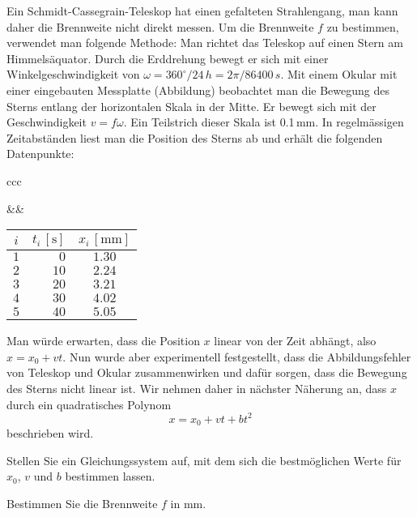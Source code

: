 Ein Schmidt-Cassegrain-Teleskop hat einen gefalteten Strahlengang,
man kann daher die Brennweite nicht direkt messen.
Um die Brennweite $f$ zu bestimmen, verwendet man folgende Methode:
Man richtet das Teleskop auf einen Stern am Himmelsäquator.
Durch die Erddrehung bewegt
er sich mit einer Winkelgeschwindigkeit von
$\omega=360^\circ/24\,h=2\pi/86400\,s$.
Mit einem Okular mit einer eingebauten Messplatte (Abbildung)
beobachtet man die Bewegung des Sterns entlang der horizontalen Skala
in der Mitte.
Er bewegt sich mit der Geschwindigkeit $v = f\omega$.
Ein Teilstrich dieser Skala ist 0.1\,mm.
In regelmässigen Zeitabständen liest man die Position des Sterns ab
und erhält die folgenden Datenpunkte:
\begin{center}
\begin{tabular}{ccc}
\begin{minipage}{0.25\hsize}
\end{minipage}&\qquad\qquad\qquad&
\begin{minipage}{0.2\hsize}
\begin{tabular}{>{$}c<{$}|>{$}r<{$}|>{$}c<{$}}
i& t_i\,[\text{s}]&x_i\,[\text{mm}]\\
\hline
1& 0&1.30\\
2&10&2.24\\
3&20&3.21\\
4&30&4.02\\
5&40&5.05
\end{tabular}
\end{minipage}
\end{tabular}
\end{center}
Man würde erwarten, dass die Position $x$ linear von der Zeit abhängt,
also $x=x_0 + vt$.
Nun wurde aber experimentell festgestellt, dass die Abbildungsfehler
von Teleskop und Okular zusammenwirken und dafür sorgen, dass die
Bewegung des Sterns nicht linear ist.
Wir nehmen daher in nächster Näherung an, dass $x$ durch ein
quadratisches Polynom
\begin{equation}
x=x_0+vt + bt^2
\label{40000026:quadratisch}
\end{equation}
beschrieben wird.

\begin{teilaufgaben}
\item
Stellen Sie ein Gleichungssystem auf, mit dem sich die bestmöglichen
Werte für $x_0$, $v$ und $b$ bestimmen lassen.
\item
Bestimmen Sie die Brennweite $f$ in mm.
\end{teilaufgaben}

